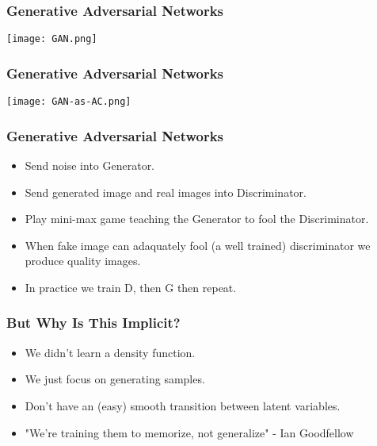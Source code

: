 \begin{frame}
    \frametitle{Generative Adversarial Networks}
    \center\texttt{[image: GAN.png]}
\end{frame}

\begin{frame}
    \frametitle{Generative Adversarial Networks}
    \center\texttt{[image: GAN-as-AC.png]}
\end{frame}

\begin{frame}
    \frametitle{Generative Adversarial Networks}
    \begin{itemize}
        \item Send noise into Generator.
        \item Send generated image and real images into Discriminator.
        \item Play mini-max game teaching the Generator to fool the
            Discriminator.
        \item When fake image can adaquately fool (a well trained) discriminator
            we produce quality images. 
        \item<2-> In practice we train D, then G then repeat. 
    \end{itemize}
\end{frame}

\begin{frame}
    \frametitle{But Why Is This Implicit?}
    \begin{itemize}
        \item We didn't learn a density function.
        \item We just focus on generating samples.
        \item Don't have an (easy) smooth transition between latent variables.
        \item "We're training them to memorize, not generalize" - Ian Goodfellow
    \end{itemize}
\end{frame}


